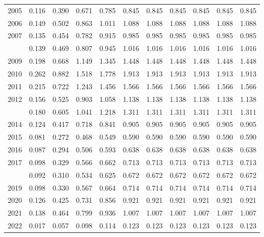 \documentclass[
]{article}
\begin{document}
\begin{longtable}[t]{lrrrrrrrrrr}
2005 & 0.116 & 0.390 & 0.671 & 0.785 & 0.845 & 0.845 & 0.845 & 0.845 & 0.845 & 0.845\\
2006 & 0.149 & 0.502 & 0.863 & 1.011 & 1.088 & 1.088 & 1.088 & 1.088 & 1.088 & 1.088\\
2007 & 0.135 & 0.454 & 0.782 & 0.915 & 0.985 & 0.985 & 0.985 & 0.985 & 0.985 & 0.985\\
\addlinespace
2008 & 0.139 & 0.469 & 0.807 & 0.945 & 1.016 & 1.016 & 1.016 & 1.016 & 1.016 & 1.016\\
2009 & 0.198 & 0.668 & 1.149 & 1.345 & 1.448 & 1.448 & 1.448 & 1.448 & 1.448 & 1.448\\
2010 & 0.262 & 0.882 & 1.518 & 1.778 & 1.913 & 1.913 & 1.913 & 1.913 & 1.913 & 1.913\\
2011 & 0.215 & 0.722 & 1.243 & 1.456 & 1.566 & 1.566 & 1.566 & 1.566 & 1.566 & 1.566\\
2012 & 0.156 & 0.525 & 0.903 & 1.058 & 1.138 & 1.138 & 1.138 & 1.138 & 1.138 & 1.138\\
\addlinespace
2013 & 0.180 & 0.605 & 1.041 & 1.218 & 1.311 & 1.311 & 1.311 & 1.311 & 1.311 & 1.311\\
2014 & 0.124 & 0.417 & 0.718 & 0.841 & 0.905 & 0.905 & 0.905 & 0.905 & 0.905 & 0.905\\
2015 & 0.081 & 0.272 & 0.468 & 0.549 & 0.590 & 0.590 & 0.590 & 0.590 & 0.590 & 0.590\\
2016 & 0.087 & 0.294 & 0.506 & 0.593 & 0.638 & 0.638 & 0.638 & 0.638 & 0.638 & 0.638\\
2017 & 0.098 & 0.329 & 0.566 & 0.662 & 0.713 & 0.713 & 0.713 & 0.713 & 0.713 & 0.713\\
\addlinespace
2018 & 0.092 & 0.310 & 0.534 & 0.625 & 0.672 & 0.672 & 0.672 & 0.672 & 0.672 & 0.672\\
2019 & 0.098 & 0.330 & 0.567 & 0.664 & 0.714 & 0.714 & 0.714 & 0.714 & 0.714 & 0.714\\
2020 & 0.126 & 0.425 & 0.731 & 0.856 & 0.921 & 0.921 & 0.921 & 0.921 & 0.921 & 0.921\\
2021 & 0.138 & 0.464 & 0.799 & 0.936 & 1.007 & 1.007 & 1.007 & 1.007 & 1.007 & 1.007\\
2022 & 0.017 & 0.057 & 0.098 & 0.114 & 0.123 & 0.123 & 0.123 & 0.123 & 0.123 & 0.123\\*
\end{longtable}
\end{document}
